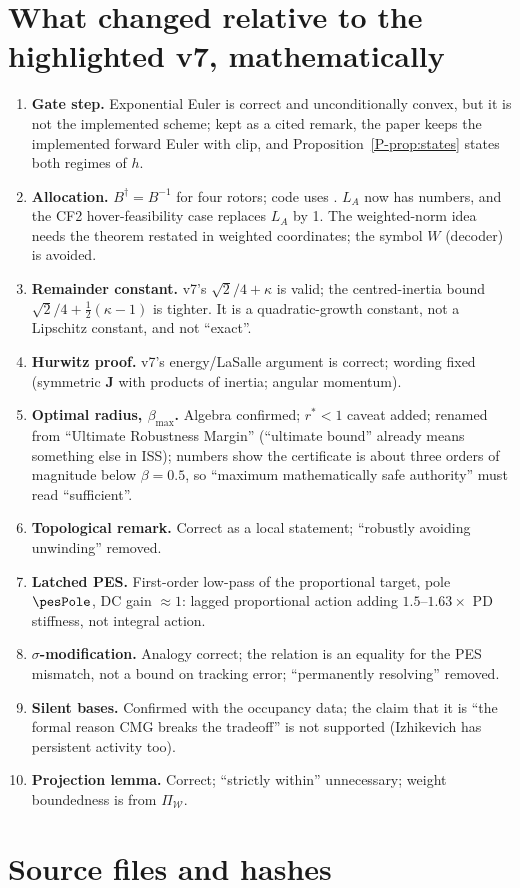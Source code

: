 \documentclass[11pt]{article}
\newcommand{\PT}[1]{\ref{P-#1}}               %
\newcommand{\code}[1]{\texttt{\detokenize{#1}}}
\theoremstyle{remark}
\begin{document}
\section{What changed relative to the highlighted v7, mathematically}
\begin{enumerate}
\item \textbf{Gate step.} Exponential Euler is correct and unconditionally convex, but it is not the implemented
  scheme; kept as a cited remark, the paper keeps the implemented forward Euler with clip, and Proposition~\PT{prop:states}
  states both regimes of $h$.
\item \textbf{Allocation.} $B^\dagger=B^{-1}$ for four rotors; code uses \code{np.linalg.inv}. $L_A$ now has numbers,
  and the CF2 hover-feasibility case replaces $L_A$ by 1. The weighted-norm idea needs the theorem restated in
  weighted coordinates; the symbol $W$ (decoder) is avoided.
\item \textbf{Remainder constant.} v7's $\sqrt2/4+\kappa$ is valid; the centred-inertia bound
  $\sqrt2/4+\frac12(\kappa-1)$ is tighter. It is a quadratic-growth constant, not a Lipschitz constant, and not
  ``exact''.
\item \textbf{Hurwitz proof.} v7's energy/LaSalle argument is correct; wording fixed (symmetric $\bm J$ with products of
  inertia; angular momentum).
\item \textbf{Optimal radius, $\beta_{\max}$.} Algebra confirmed; $r^*<1$ caveat added; renamed from ``Ultimate
  Robustness Margin'' (``ultimate bound'' already means something else in ISS); numbers show the certificate is
  about three orders of magnitude below $\beta=0.5$, so ``maximum mathematically safe authority'' must read
  ``sufficient''.
\item \textbf{Topological remark.} Correct as a local statement; ``robustly avoiding unwinding'' removed.
\item \textbf{Latched PES.} First-order low-pass of the proportional target, pole $\pesPole$, DC gain $\approx1$:
  lagged proportional action adding $1.5$--$1.63\times$ PD stiffness, not integral action.
\item \textbf{$\sigma$-modification.} Analogy correct; the relation is an equality for the PES mismatch, not a bound on
  tracking error; ``permanently resolving'' removed.
\item \textbf{Silent bases.} Confirmed with the occupancy data; the claim that it is ``the formal reason CMG breaks the
  tradeoff'' is not supported (Izhikevich has persistent activity too).
\item \textbf{Projection lemma.} Correct; ``strictly within'' unnecessary; weight boundedness is from $\Pi_{\mathcal W}$.
\end{enumerate}

\appendix
\section{Source files and hashes}\label{app:hashes}
{\small}



\end{document}
